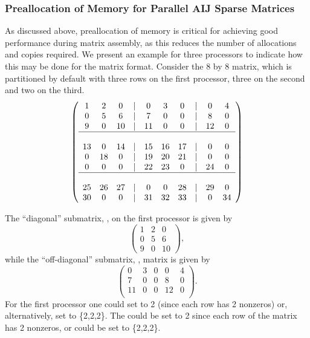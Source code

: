\subsubsection{Preallocation of Memory for Parallel AIJ Sparse Matrices}

As discussed above, preallocation of memory is critical for achieving good
performance during matrix assembly, as this reduces the number of
allocations and copies required.  We present an example for
three processors to indicate how this may be done for the 
matrix format.  Consider the 8 by
8 matrix, which is partitioned by default with three rows on the first
processor, three on the second and two on the third.  {\small
\[
\left( \begin{array}{cccccccccc} 
1  & 2  & 0  & | & 0  & 3  & 0  & |  & 0  & 4  \\
0  & 5  & 6  & | & 7  & 0  & 0  & |  & 8  & 0 \\
9  & 0  & 10 & | & 11 & 0  & 0  & |  & 12 & 0  \\
\hline \\
13 & 0  & 14 & | & 15 & 16 & 17 & |  & 0  & 0  \\
0  & 18 & 0  & | & 19 & 20 & 21 & |  & 0  & 0 \\
0  & 0  & 0  & | & 22 & 23 & 0  & |  & 24 & 0 \\
\hline \\
25 & 26 & 27 & | & 0  & 0  & 28 & |  & 29 & 0 \\
30 & 0  & 0  & | & 31 & 32 & 33 & |  & 0  &34 
\end{array} \right)
\]
}

The ``diagonal'' submatrix, , on the first processor is given by 
{\small
\[
\left( \begin{array}{ccc} 
1  & 2  & 0  \\
0  & 5  & 6  \\
9  & 0  & 10 
\end{array} \right),
\]
}
while the ``off-diagonal'' submatrix, , matrix is given by 
{\small
\[
\left( \begin{array}{ccccc} 
 0  & 3  & 0   & 0  & 4  \\
 7  & 0  & 0   & 8  & 0  \\
 11 & 0  & 0   & 12 & 0  \\
\end{array} \right).
\]
}
For the first processor one could set  to 2 (since each
row has 2 nonzeros) or, alternatively, set  to \{2,2,2\}.
The  could be set to 2 since each row of the  matrix
has 2 nonzeros, or  could be set to \{2,2,2\}.

